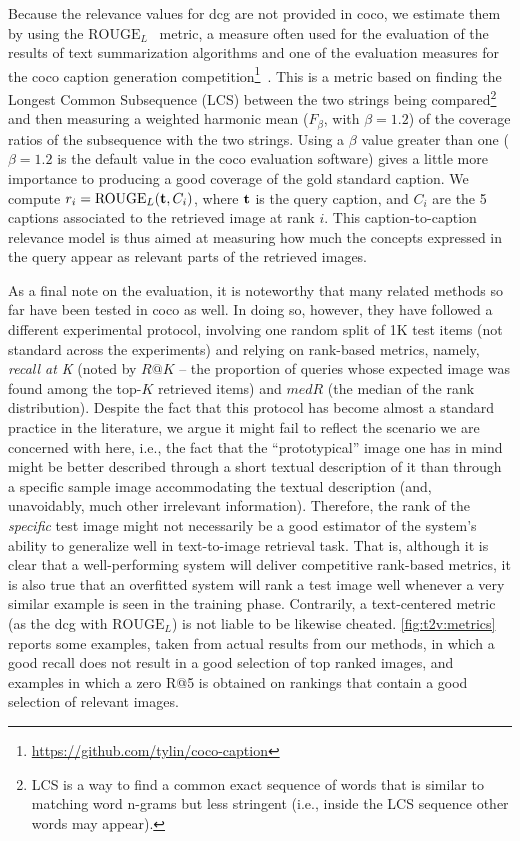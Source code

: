 Because the relevance values for \gls{dcg} are not provided in \gls{coco}, we estimate them by using the $\text{ROUGE}_L$~\cite{lin2004rouge} metric, a measure often used for the evaluation of the results of text summarization algorithms and one of the evaluation measures for the \gls{coco} caption generation competition\footnote{\url{https://github.com/tylin/coco-caption}}~\cite{chen2015microsoft}.
This is a metric based on finding the Longest Common Subsequence (LCS) between the two strings being compared\footnote{LCS is a way to find a common exact sequence of words that is similar to matching word n-grams but less stringent (i.e.,  inside the LCS sequence other words may appear).} and then measuring a weighted harmonic mean ($F_\beta$, with $\beta=1.2$) of the coverage ratios of the subsequence with the two strings.
Using a $\beta$ value greater than one ($\beta=1.2$ is the default value in the \gls{coco} evaluation software) gives a little more importance to producing a good coverage of the gold standard caption.
We compute $r_i = \text{ROUGE}_L ( \mathbf{t}, C_i ) $, where $\mathbf{t}$ is the query caption, and $C_i$ are the 5 captions associated to the retrieved image at rank $i$.
This caption-to-caption relevance model is thus aimed at measuring how much the concepts expressed in the query appear as relevant parts of the retrieved images.

As a final note on the evaluation, it is noteworthy that many related methods so far \cite{mao2014deep,ma2015multimodal,klein2014fisher,karpathy2015deep,donahue2015long,kiros2015skip,wang2016learning} have been tested in \gls{coco} as well.
In doing so, however, they have followed a different experimental protocol, involving one random split of 1K test items (not standard across the experiments) and relying on rank-based metrics, namely, \emph{recall at K} (noted by $R@K$ -- the proportion of queries whose expected image was found among the top-$K$ retrieved items) and $medR$ (the median of the rank distribution).
Despite the fact that this protocol has become almost a standard practice in the literature, we argue it might fail to reflect the scenario we are concerned with here, i.e.,  the fact that the ``prototypical'' image one has in mind might be better described through a short textual description of it than through a specific sample image accommodating the textual description (and, unavoidably, much other irrelevant information).
Therefore, the rank of the \emph{specific} test image might not necessarily be a good estimator of the system's ability to generalize well in text-to-image retrieval task.
That is, although it is clear that a well-performing system will deliver competitive rank-based metrics, it is also true that an overfitted system will rank a test image well whenever a very similar example is seen in the training phase.
Contrarily, a text-centered metric (as the \gls{dcg} with $\text{ROUGE}_L$) is not liable to be likewise cheated.
\ref{fig:t2v:metrics} reports some examples, taken from actual results from our methods, in which a good recall does not result in a good selection of top ranked images, and examples in which a zero R@5 is obtained on rankings that contain a good selection of relevant images.

